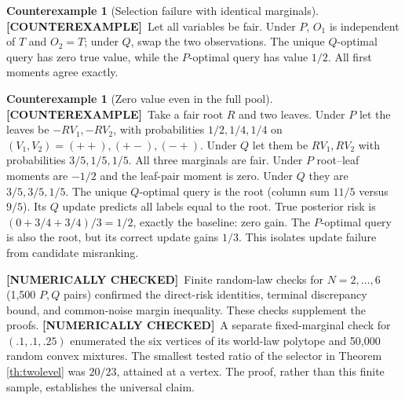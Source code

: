 \documentclass[11pt]{article}
\theoremstyle{definition}
\newtheorem{example}[theorem]{Counterexample}
\newcommand{\1}{\mathbf 1}
\newcommand{\ce}{\textbf{[COUNTEREXAMPLE]}}
\newcommand{\nc}{\textbf{[NUMERICALLY CHECKED]}}
\begin{document}
\begin{example}[Selection failure with identical marginals]\label{ex:selection}
\ce\ Let all variables be fair. Under $P$, $O_1$ is independent of $T$ and
$O_2=T$; under $Q$, swap the two observations. The unique $Q$-optimal query
has zero true value, while the $P$-optimal query has value $1/2$.
All first moments agree exactly.
\end{example}
\begin{example}[Zero value even in the full pool]\label{ex:update}
\ce\ Take a fair root $R$ and two leaves. Under $P$ let the leaves be
$-RV_1,-RV_2$, with probabilities $1/2,1/4,1/4$ on
$(V_1,V_2)=(++),(+-),(-+)$.
Under $Q$ let them be $RV_1,RV_2$ with probabilities $3/5,1/5,1/5$.
All three marginals are fair. Under $P$ root--leaf moments are $-1/2$ and
the leaf-pair moment is zero. Under $Q$ they are $3/5,3/5,1/5$.
The unique $Q$-optimal query is the root (column sum $11/5$ versus $9/5$).
Its $Q$ update predicts all labels equal to the root. True posterior risk
is $(0+3/4+3/4)/3=1/2$, exactly the baseline: zero gain.
The $P$-optimal query is also the root, but its correct update gains $1/3$.
This isolates update failure from candidate misranking.
\end{example}
\nc\ Finite random-law checks for $N=2,\ldots,6$ (1,500 $P,Q$ pairs)
confirmed the direct-risk identities, terminal discrepancy bound, and
common-noise margin inequality. These checks supplement the proofs.
\nc\ A separate fixed-marginal check for $(.1,.1,.25)$ enumerated the six
vertices of its world-law polytope and 50,000 random convex mixtures.
The smallest tested ratio of the selector in Theorem \ref{th:twolevel}
was $20/23$, attained at a vertex. The proof, rather than this finite
sample, establishes the universal claim.
\end{document}
